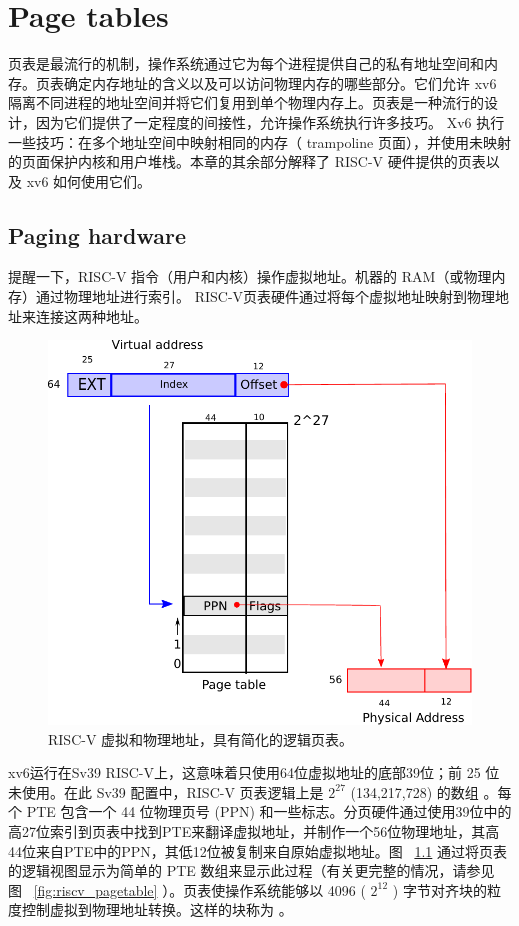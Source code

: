 

   \chapter{Page tables}   
    \label{CH:MEM}     

页表是最流行的机制，操作系统通过它为每个进程提供自己的私有地址空间和内存。页表确定内存地址的含义以及可以访问物理内存的哪些部分。它们允许 xv6 隔离不同进程的地址空间并将它们复用到单个物理内存上。页表是一种流行的设计，因为它们提供了一定程度的间接性，允许操作系统执行许多技巧。 Xv6 执行一些技巧：在多个地址空间中映射相同的内存（ trampoline 页面），并使用未映射的页面保护内核和用户堆栈。本章的其余部分解释了 RISC-V 硬件提供的页表以及 xv6 如何使用它们。
    \section{Paging hardware}    提醒一下，RISC-V 指令（用户和内核）操作虚拟地址。机器的 RAM（或物理内存）通过物理地址进行索引。 RISC-V页表硬件通过将每个虚拟地址映射到物理地址来连接这两种地址。  

   \begin{figure}[t]
\center
\includegraphics[scale=0.5]{fig/riscv_address.pdf}
\caption{RISC-V 虚拟和物理地址，具有简化的逻辑页表。  }
\label{fig:riscv_address}
\end{figure}     

xv6运行在Sv39 RISC-V上，这意味着只使用64位虚拟地址的底部39位；前 25 位未使用。在此 Sv39 配置中，RISC-V 页表逻辑上是    $2^{27}$    (134,217,728) 的数组
        。每个 PTE 包含一个 44 位物理页号 (PPN) 和一些标志。分页硬件通过使用39位中的高27位索引到页表中找到PTE来翻译虚拟地址，并制作一个56位物理地址，其高44位来自PTE中的PPN，其低12位被复制来自原始虚拟地址。图~    \ref{fig:riscv_address}    通过将页表的逻辑视图显示为简单的 PTE 数组来显示此过程（有关更完整的情况，请参见图~    \ref{fig:riscv_pagetable}   ）。页表使操作系统能够以 4096 (    $2^{12}$    ) 字节对齐块的粒度控制虚拟到物理地址转换。这样的块称为        。  

